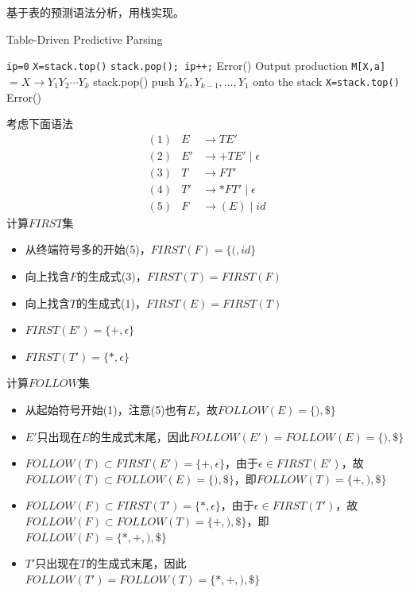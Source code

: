 基于表的预测语法分析，用栈实现。
\begin{algorithm}[H]
\caption{Table-Driven Predictive Parsing}
\begin{algorithmic}[1]
\State \verb'ip=0'
\State \verb'X=stack.top()'
\State \verb'stack.pop(); ip++;'
\Else {}
\State Error()
\Else
\State Output production \verb'M[X,a]'$=X\to Y_1Y_2\cdots Y_k$
\State stack.pop()
\State push $Y_k,Y_{k-1},\ldots,Y_1$ onto the stack
\EndIf
\EndIf
\State \verb'X=stack.top()'
\EndWhile
{}
\State Error()
\EndIf
\end{algorithmic}
\end{algorithm}

\begin{example}
考虑下面语法
\[\begin{array}{lrl}
(1) & E &\to T E'\\
(2) & E' &\to + T E'\mid\epsilon\\
(3) & T &\to F T'\\
(4) & T' &\to * F T'\mid\epsilon\\
(5) & F &\to (E) \mid id
\end{array}\]
计算$FIRST$集
\begin{itemize}
	\item 从终端符号多的开始(5)，$FIRST(F)=\{(,id\}$
	\item 向上找含$F$的生成式(3)，$FIRST(T)=FIRST(F)$
	\item 向上找含$T$的生成式(1)，$FIRST(E)=FIRST(T)$
	\item $FIRST(E')=\{+,\epsilon\}$
	\item $FIRST(T')=\{*,\epsilon\}$
\end{itemize}
计算$FOLLOW$集
\begin{itemize}
	\item 从起始符号开始(1)，注意(5)也有$E$，故$FOLLOW(E)=\{),\$\}$
	\item $E'$只出现在$E$的生成式末尾，因此$FOLLOW(E')=FOLLOW(E)=\{),\$\}$
	\item $FOLLOW(T)\subset FIRST(E')=\{+,\epsilon\}$，由于$\epsilon\in FIRST(E')$，故$FOLLOW(T)\subset FOLLOW(E)=\{),\$\}$，即$FOLLOW(T)=\{+,),\$\}$
	\item $FOLLOW(F)\subset FIRST(T')=\{*,\epsilon\}$，由于$\epsilon\in FIRST(T')$，故$FOLLOW(F)\subset FOLLOW(T)=\{+,),\$\}$，即$FOLLOW(F)=\{*,+,),\$\}$
	\item $T'$只出现在$T$的生成式末尾，因此$FOLLOW(T')=FOLLOW(T)=\{*,+,),\$\}$
\end{itemize}

\end{example}
